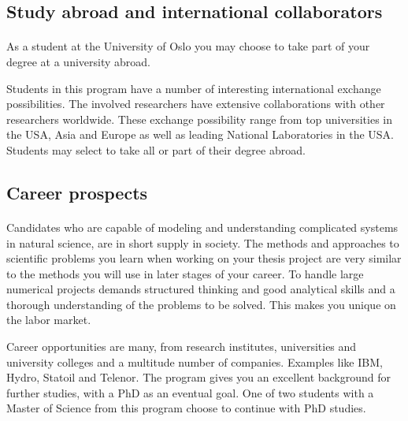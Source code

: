 \documentclass[%
twoside,                 %
final,                   %
10pt]{article}
\begin{document}
\noindent




\subsection*{Study abroad and international collaborators}

\paragraph{}

As a student at the University of Oslo you may choose to take part of
your degree at a university abroad. 

Students in this program have a number of interesting international
exchange possibilities. The involved researchers have extensive
collaborations with other researchers worldwide. These exchange
possibility range from top universities in the USA, Asia and Europe as
well as leading National Laboratories in the USA.  Students may select
to take all or part of their degree abroad.





\subsection*{Career prospects}

\paragraph{}
Candidates who are capable
of modeling and understanding complicated systems in natural science,
are in short supply in society.  The methods and approaches to
scientific problems you learn when working on your thesis project are
very similar to the methods you will use in later stages of your
career.  To handle large numerical projects demands structured
thinking and good analytical skills and a thorough understanding of
the problems to be solved. This makes you unique on the labor market.

Career opportunities are many, from research institutes, universities
and university colleges and a multitude number of companies. Examples
like IBM, Hydro, Statoil and Telenor.  The program gives you an
excellent background for further studies, with a PhD as an eventual
goal. One of two students with a Master of Science from this program
choose to continue with PhD studies.
\end{document}
